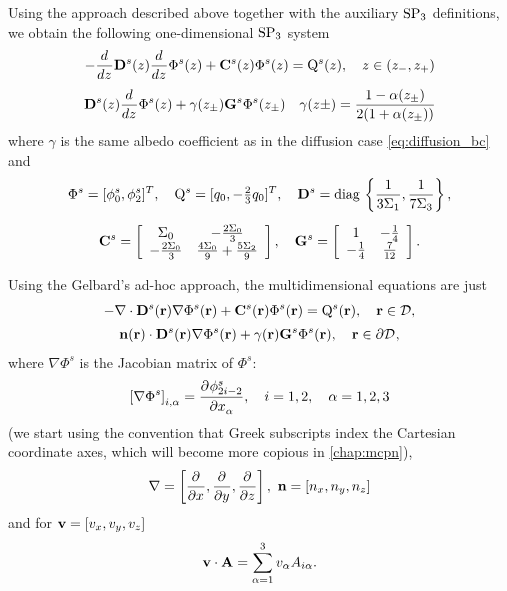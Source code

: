 Using the approach described above together with the auxiliary $\SPN[3]$ definitions, we obtain the following
one-dimensional $\SPN[3]$ system
\begin{equation}\label{eq:sp3_1d}
\begin{gathered}
	-\der{}{z} \mathbf D^s(z) \der{}{z} \Phi^s(z) + \mathbf{C}^s(z) \Phi^s(z) = \mathrm{Q}^s(z), \quad z \in
	(z_{-},z_{+})\\[.3em]
	\mat{D}^s(z) \der{}{z} \Phi^s(z) + \gamma(z_{\pm}) \mat{G}^s \Phi^s(z_{\pm})
	\quad
	\gamma(z\pm) =
	\frac{1-\alpha(z_{\pm})}{2(1+\alpha(z_{\pm}))}
\end{gathered}
\end{equation}
where $\gamma$ is the same albedo coefficient as in the diffusion case \eqref{eq:diffusion_bc} and
\begin{equation}\label{eq:SP3_mat}
\begin{gathered}
	\Phi^s = [\phi^s_0, \phi^s_2]^T,\quad \mathrm{Q}^s = [q_0, -\tfrac{2}{3} q_0]^T, \quad 
	\mat{D}^s = \diag \left\{\frac{1}{3\Sigma_1}, \frac{1}{7\Sigma_3}\right\},\\[.5em]
	\mat{C}^s = \left[
\begin{array}{cc}
 \Sigma _0 & -\frac{2 \Sigma _0}{3} \\
 -\frac{2 \Sigma _0}{3}  & \frac{4 \Sigma _0}{9}+\frac{5 \Sigma _2}{9}
\end{array}
\right],\quad 
\mat{G}^s = \left[
\begin{array}{cc}
 1 & -\frac{1}{4} \\
 -\frac{1}{4} & \frac{7}{12} \\
\end{array}
\right].
\end{gathered}
\end{equation}

Using the Gelbard's ad-hoc approach, the multidimensional equations are just
\begin{equation}\label{eq:sp3}
\begin{gathered}
	-\nabla\cdot \mat{D}^s(\br) \nabla \Phi^s(\br) + \mat{C}^s(\br) \Phi^s(\br) = \mathrm{Q}^s(\br), \quad \br \in
	\VV,\\[.2em]
	\bn(\br)\cdot\mat{D}^s(\br) \nabla \Phi^s(\br) + \gamma(\br) \mathbf{G}^s \Phi^s(\br), \quad \br\in\pV,
\end{gathered}
\end{equation}
where $\nabla\Phi^s$ is the Jacobian matrix of $\Phi^s$:
$$
	\left[\nabla\Phi^s\right]_{i,\alpha} = \pd{\phi^s_{2i-2}}{x_\alpha},\quad i = 1,2,\quad \alpha = 1,2,3
$$
(we start using the convention that Greek subscripts index the Cartesian coordinate axes, which will become more
copious in \cref{chap:mcpn}), $$ \nabla = \left[\pd{}{x}, \pd{}{y}, \pd{}{z}\right],\ \bn = [n_x, n_y, n_z]
$$
and for $\bv = [v_x, v_y, v_z]$
$$
	\bv \cdot \mat{A} = \sum_{\alpha=1}^3 v_\alpha A_{i\alpha}.
$$

